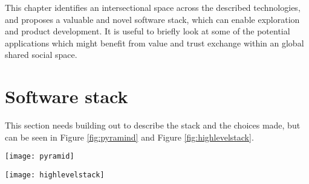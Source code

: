 This chapter identifies an intersectional space across the described technologies, and proposes a valuable and novel software stack, which can enable exploration  and product development. It is useful to briefly look at some of the potential applications which might benefit from value and trust exchange within an global shared social space.



\section{Software stack}
This section needs building out to describe the stack and the choices made, but can be seen in Figure \ref{fig:pyramind} and Figure \ref{fig:highlevelstack}.

\begin{figure*}[ht]\centering 	\texttt{[image: pyramid]}
	\caption{Pyramid showing the components for sats, stablecoins on lightning, asssets, and trust}
	\label{fig:pyramind}
\end{figure*}

\begin{figure*}[ht]\centering 	\texttt{[image: highlevelstack]}
	\caption{High level overview showing the components for sats, stablecoins on lightning, asssets, and trust}
	\label{fig:highlevelstack}
\end{figure*}

